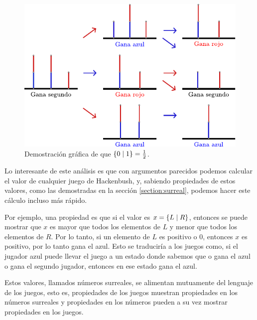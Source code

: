 \begin{figure}[h]
    \centering
    \includegraphics[width=.7\textwidth]{images/hackenbush-half_proof.pdf}
    \caption{Demostraci\'on gr\'afica de que $\left\{0\;\middle|\; 1\right\}=\frac{1}{2}$.}
    \label{figure:hackenbush-half_proof}
\end{figure}

Lo interesante de este an\'alisis es que con argumentos parecidos podemos calcular el valor de cualquier juego de Hackenbush, y, sabiendo propiedades de estos valores, como las demostradas en la secci\'on \ref{section:surreal}, podemos hacer este c\'alculo incluso m\'as r\'apido.

Por ejemplo, una propiedad es que si el valor es $x=\left\{L\;\middle|\; R\right\}$, entonces se puede mostrar que $x$ es mayor que todos los elementos de $L$ y menor que todos los elementos de $R$. Por lo tanto, si un elemento de $L$ es positivo o $0$, entonces $x$ es positivo, por lo tanto gana el azul. Esto se traducir\'ia a los juegos como, si el jugador azul puede llevar el juego a un estado donde sabemos que o gana el azul o gana el segundo jugador, entonces en ese estado gana el azul.

Estos valores, llamados n\'umeros surreales, se alimentan mutuamente del lenguaje de los juegos, esto es, propiedades de los juegos muestran propiedades en los n\'umeros surreales y propiedades en los n\'umeros pueden a su vez mostrar propiedades en los juegos.